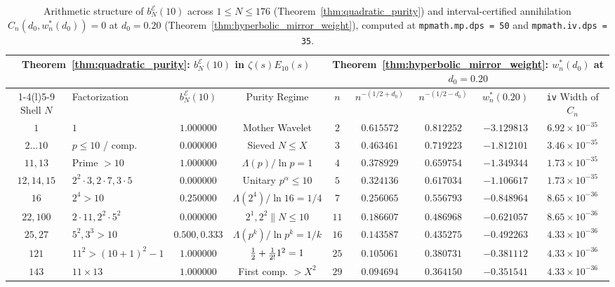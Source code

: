 \documentclass[11pt,reqno]{amsart}
\theoremstyle{definition}
\theoremstyle{remark}
\numberwithin{equation}{section}
\newcommand{\fac}{\mathclose{\mathchar"0021}}
\begin{document}
\begin{table}[t]
\centering
\caption{Arithmetic structure of $b_N^{\mathcal{E}}(10)$ across $1 \le N \le 176$ (Theorem~\ref{thm:quadratic_purity}) and interval-certified annihilation $C_n(d_0, w_n^*(d_0)) = 0$ at $d_0 = 0.20$ (Theorem~\ref{thm:hyperbolic_mirror_weight}), computed at \texttt{mpmath.mp.dps = 50} and \texttt{mpmath.iv.dps = 35}.}\label{tab:purity_and_mirror}
\scriptsize
\setlength{\tabcolsep}{3.2pt}
\begin{tabular}{@{}clcc|ccccc@{}}
\toprule
\multicolumn{4}{c|}{Theorem~\ref{thm:quadratic_purity}: $b_N^{\mathcal{E}}(10)$ in $\zeta(s)E_{10}(s)$} & \multicolumn{5}{c}{Theorem~\ref{thm:hyperbolic_mirror_weight}: $w_n^*(d_0)$ at $d_0 = 0.20$} \\
\cmidrule(r){1-4}\cmidrule(l){5-9}
Shell $N$ & Factorization & $b_N^{\mathcal{E}}(10)$ & Purity Regime & $n$ & $n^{-(1/2+d_0)}$ & $n^{-(1/2-d_0)}$ & $w_n^*(0.20)$ & \texttt{iv} Width of $C_n$ \\
\midrule
$1$ & $1$ & $1.000000$ & Mother Wavelet & $2$ & $0.615572$ & $0.812252$ & $-3.129813$ & $6.92 \times 10^{-35}$ \\
$2 \dots 10$ & $p \le 10$ / comp. & $0.000000$ & Sieved $N \le X$ & $3$ & $0.463461$ & $0.719223$ & $-1.812101$ & $3.46 \times 10^{-35}$ \\
$11, 13$ & Prime $> 10$ & $1.000000$ & $\Lambda(p)/\ln p = 1$ & $4$ & $0.378929$ & $0.659754$ & $-1.349344$ & $1.73 \times 10^{-35}$ \\
$12, 14, 15$ & $2^2\!\cdot\!3, 2\!\cdot\!7, 3\!\cdot\!5$ & $0.000000$ & Unitary $p^\alpha \le 10$ & $5$ & $0.324136$ & $0.617034$ & $-1.106617$ & $1.73 \times 10^{-35}$ \\
$16$ & $2^4 > 10$ & $0.250000$ & $\Lambda(2^4)/\ln 16 = 1/4$ & $7$ & $0.256065$ & $0.556793$ & $-0.848964$ & $8.65 \times 10^{-36}$ \\
$22, 100$ & $2\!\cdot\!11, 2^2\!\cdot\!5^2$ & $0.000000$ & $2^1, 2^2 \parallel N \le 10$ & $11$ & $0.186607$ & $0.486968$ & $-0.621057$ & $8.65 \times 10^{-36}$ \\
$25, 27$ & $5^2, 3^3 > 10$ & $0.500, 0.333$ & $\Lambda(p^k)/\ln p^k = 1/k$ & $16$ & $0.143587$ & $0.435275$ & $-0.492263$ & $4.33 \times 10^{-36}$ \\
$121$ & $11^2 > (10+1)^2\!-\!1$ & $1.000000$ & $\frac{1}{2} + \frac{1}{2\fac}1^2 = 1$ & $25$ & $0.105061$ & $0.380731$ & $-0.381112$ & $4.33 \times 10^{-36}$ \\
$143$ & $11 \times 13$ & $1.000000$ & First comp. $> X^2$ & $29$ & $0.094694$ & $0.364150$ & $-0.351541$ & $4.33 \times 10^{-36}$ \\
\bottomrule
\end{tabular}
\end{table}
\end{document}
